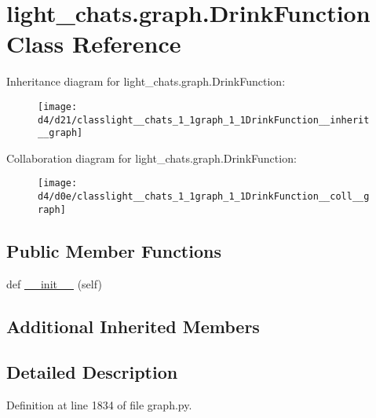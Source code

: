 \hypertarget{classlight__chats_1_1graph_1_1DrinkFunction}{}\section{light\+\_\+chats.\+graph.\+Drink\+Function Class Reference}
\label{classlight__chats_1_1graph_1_1DrinkFunction}


Inheritance diagram for light\+\_\+chats.\+graph.\+Drink\+Function\+:
\nopagebreak
\begin{figure}[H]
\begin{center}
\leavevmode
\texttt{[image: d4/d21/classlight\_\_chats\_1\_1graph\_1\_1DrinkFunction\_\_inherit\_\_graph]}
\end{center}
\end{figure}


Collaboration diagram for light\+\_\+chats.\+graph.\+Drink\+Function\+:
\nopagebreak
\begin{figure}[H]
\begin{center}
\leavevmode
\texttt{[image: d4/d0e/classlight\_\_chats\_1\_1graph\_1\_1DrinkFunction\_\_coll\_\_graph]}
\end{center}
\end{figure}
\subsection*{Public Member Functions}
\begin{DoxyCompactItemize}
\item 
def \hyperlink{classlight__chats_1_1graph_1_1DrinkFunction_ab7c7036ff0885b5263458d0a75d5d878}{\+\_\+\+\_\+init\+\_\+\+\_\+} (self)
\end{DoxyCompactItemize}
\subsection*{Additional Inherited Members}


\subsection{Detailed Description}
\begin{DoxyVerb}
\end{DoxyVerb}
 

Definition at line 1834 of file graph.\+py.



